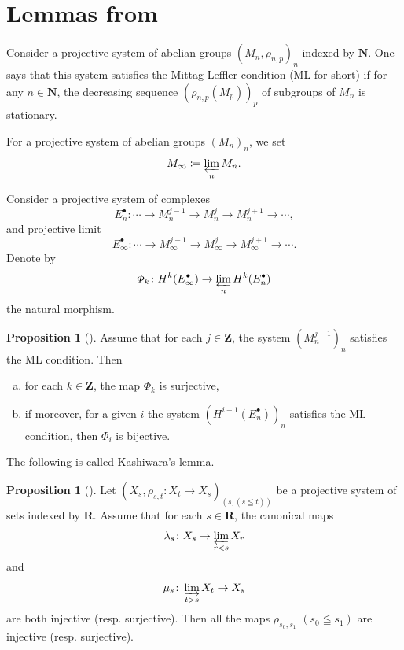 ﻿\documentclass[a4paper,leqno]{jsarticle}
\theoremstyle{definition}
\newtheorem{Proposition+}[Axiom+]{Proposition}
\newcommand{\nn}{\mathbf{N}}
\newcommand{\zz}{\mathbf{Z}}
\newcommand{\rr}{\mathbf{R}}
\numberwithin{equation}{section}
\newcommand{\indlim}[1][]{\mathop{\varinjlim}\limits_{#1}}
\newcommand{\prolim}[1][]{\mathop{\varprojlim}\limits_{#1}}
\theoremstyle{mystyle}
\begin{document}
\section{Lemmas from {\cite{KS90}}}\label{sec:lemmas}

Consider a projective system of abelian groups \(
  \left(M_n,\rho_{n,p}\right)_n
\) indexed by \(\nn\). 
One says that this system satisfies 
the Mittag-Leffler condition (ML for short) 
if for any \(n\in\nn\), the decreasing sequence \(
  (\rho_{n,p}(M_p))_p
\) of subgroups of \(M_n\) is stationary.

For a projective system of abelian groups \((M_{n})_n\), 
we set \[
  M_{\infty}\coloneqq \prolim[n]M_n.
\]

Consider a projective system of complexes
\begin{equation}
  E_n^{\bullet}\colon 
  \cdots\to M_{n}^{j-1}\to M_{n}^{j}\to M_{n}^{j+1}\to\cdots,
\end{equation}
and projective limit
\begin{equation}
  E_{\infty}^{\bullet}\colon 
  \cdots
  \to M_{\infty}^{j-1}
  \to M_{\infty}^{j}
  \to M_{\infty}^{j+1}
  \to\cdots.
\end{equation}
Denote by 
\begin{equation}
  \varPhi_{k}\colon H^{k}(E_{\infty}^{\bullet})\to \prolim[n]H^{k}(E_{n}^{\bullet})
\end{equation}
the natural morphism.

\begin{Proposition+}[{\cite[Proposition 1.12.4]{KS90}}]\label{prop:ks1.12.4}
  Assume that for each \(j\in\zz\), 
  the system \(\left(M_{n}^{j-1}\right)_{n}\) satisfies 
  the ML condition. 
  Then
  \begin{enumerate}[(a)]
    \item for each \(k\in \zz\), the map \(\varPhi_k\) is surjective,
    \item if moreover, for a given \(i\) the system \(\left(H^{i-1}(E_{n}^{\bullet})\right)_{n}\) satisfies the ML condition, then \(\varPhi_i\) is bijective.
  \end{enumerate} 
\end{Proposition+}

The following is called Kashiwara's lemma.

\begin{Proposition+}[{\cite[Proposition 1.12.6]{KS90}}]\label{prop:ks1.12.6}
  Let \(\left(X_s,\rho_{s,t}\colon X_t\to X_s\right)_{(s,(s\leqq t))}\) be 
  a projective system of sets indexed by \(\rr\). 
  Assume that for each \(s\in\rr\), the canonical maps\[
    \lambda_s\colon X_s\to\prolim[r<s]X_r
  \] and \[
    \mu_s\colon \indlim[t>s]X_t\to X_s
  \] are both injective (resp. surjective). 
  Then all the maps \(\rho_{s_{0},s_{1}}\) \((s_0\leqq s_1)\) are 
  injective (resp. surjective).
\end{Proposition+}
\end{document}
